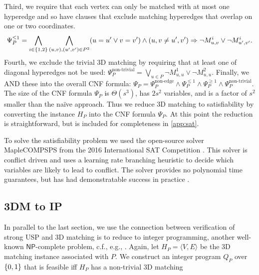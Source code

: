 \documentclass[11pt]{article}
\renewcommand\NP{\ensuremath{\mathsf{NP}}}
\begin{document}
Third, we require that each vertex can only be matched with at most one hyperedge and so have clauses that exclude matching hyperedges that
overlap on one or two coordinates.
\begin{equation}
  \Psi_P^{\le 1} = \bigwedge_{i \in \left\{ 1,2 \right\}} \bigwedge_{(u,v),
    (u',v') \in P^2} (u = u' \vee v = v') \wedge (u,v \neq u',v')
  \Rightarrow \neg M_{u,v}^i \vee \neg M_{u',v'}^i.
\end{equation}
Fourth, we exclude the trivial 3D matching by requiring that at least
one of diagonal hyperedges not be used:
  $\Psi_P^{\text{non-trivial}} = \bigvee_{u \in P} \neg M_{u,u}^1 \vee
  \neg M_{u,u}^2.$
Finally, we AND these into the overall CNF formula:
  $\Psi_P = \Psi_P^{\text{non-edge}} \wedge \Psi_P^{\le 1} \wedge
  \Psi_P^{\ge 1} \wedge \Psi_P^{\text{non-trivial}}.$
The size of the CNF formula $\Psi_P$ is $\Theta(s^3)$, has $2s^2$
variables, and is a factor of $s^2$ smaller than the na\"{i}ve
approach.  Thus we reduce 3D matching to satisfiability by converting the
instance $H_P$ into the CNF formula $\Psi_P$.  At this point the
reduction is straightforward, but is included for completeness in
\autoref{app:sat}.

To solve the satisfiability problem %
we used the open-source solver MapleCOMPSPS from the 2016
International SAT Competition \cite{bhj17}.  This solver is
conflict driven and uses a learning rate branching heuristic to decide
which variables are likely to lead to conflict.  The solver provides
no polynomial time guarantees, but has had
demonstratable success in practice \cite{lgpc16}.

\subsection{3DM to IP}

In parallel to the last section, we use the connection between verification of strong
USP and 3D matching is to reduce to integer
programming, another well-known \NP{}-complete problem, c.f., e.g., \cite{kv12}.
Again, let $H_P = \langle V, E \rangle$ be the 3D matching instance
associated with $P$.  We construct an integer program $Q_P$ over $\left\{ 0,1 \right\}$ that is feasible iff $H_P$ has a non-trivial 3D matching
\end{document}

